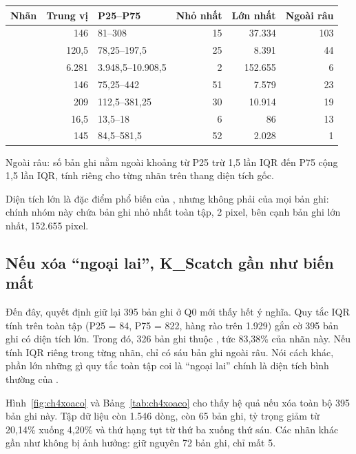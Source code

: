 \begin{center}\begin{minipage}{\linewidth}
\label{tab:ch4area}
\small{}
\begin{tabularx}{\linewidth}{@{}Y r p{3.1cm}r r r@{}}
\toprule
Nhãn & Trung vị & P25--P75 & Nhỏ nhất & Lớn nhất & Ngoài râu \\
\midrule
{} & 146 & 81--308 & 15 & 37.334 & 103 \\
 & 120,5 & 78,25--197,5 & 25 & 8.391 & 44 \\
 & 6.281 & 3.948,5--10.908,5 & 2 & 152.655 & 6 \\
 & 146 & 75,25--442 & 51 & 7.579 & 23 \\
 & 209 & 112,5--381,25 & 30 & 10.914 & 19 \\
 & 16,5 & 13,5--18 & 6 & 86 & 13 \\
 & 145 & 84,5--581,5 & 52 & 2.028 & 1 \\
\bottomrule
\end{tabularx}
\smallskip
\par\raggedright\footnotesize Ngoài râu: số bản ghi nằm ngoài khoảng từ P25 trừ 1,5 lần IQR đến P75 cộng 1,5 lần IQR, tính riêng cho từng nhãn trên thang diện tích gốc.
\end{minipage}\end{center}

Diện tích lớn là đặc điểm phổ biến của , nhưng không phải của mọi bản ghi: chính nhóm này chứa bản ghi nhỏ nhất toàn tập, 2 pixel, bên cạnh bản ghi lớn nhất, 152.655 pixel.

\subsection{Nếu xóa ``ngoại lai'', K\_Scatch gần như biến mất}

Đến đây, quyết định giữ lại 395 bản ghi ở Q0 mới thấy hết ý nghĩa. Quy tắc IQR tính trên toàn tập (P25 = 84, P75 = 822, hàng rào trên 1.929) gắn cờ 395 bản ghi có diện tích lớn. Trong đó, 326 bản ghi thuộc , tức 83,38\% của nhãn này. Nếu tính IQR riêng trong từng nhãn,  chỉ có sáu bản ghi ngoài râu. Nói cách khác, phần lớn những gì quy tắc toàn tập coi là ``ngoại lai'' chính là diện tích bình thường của .

Hình~\ref{fig:ch4xoaco} và Bảng~\ref{tab:ch4xoaco} cho thấy hệ quả nếu xóa toàn bộ 395 bản ghi này. Tập dữ liệu còn 1.546 dòng,  còn 65 bản ghi, tỷ trọng giảm từ 20,14\% xuống 4,20\% và thứ hạng tụt từ thứ ba xuống thứ sáu. Các nhãn khác gần như không bị ảnh hưởng:  giữ nguyên 72 bản ghi,  chỉ mất 5.

